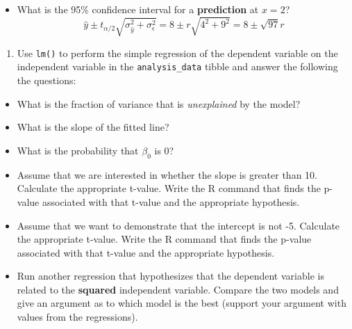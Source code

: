 \documentclass[
]{article}
\newenvironment{Shaded}{\begin{snugshade}}{\end{snugshade}}
\newcommand{\KeywordTok}[1]{\textcolor[rgb]{0.13,0.29,0.53}{\textbf{#1}}}
\newcommand{\NormalTok}[1]{#1}
\newcommand{\OperatorTok}[1]{\textcolor[rgb]{0.81,0.36,0.00}{\textbf{#1}}}
\newcommand{\StringTok}[1]{\textcolor[rgb]{0.31,0.60,0.02}{#1}}
\providecommand{\tightlist}{%
  \setlength{\itemsep}{0pt}\setlength{\parskip}{0pt}}
\begin{document}
\begin{itemize}
\tightlist
\item
  What is the 95\% confidence interval for a \textbf{prediction} at
  \(x = 2\)?
  \[\hat{y}\pm t_{\alpha/2}\sqrt{\sigma_{\hat{y}}^2+\sigma_\epsilon^2}=8\pm r\sqrt{4^2+9^2}=\boxed{8\pm\sqrt{97}r}\]
\end{itemize}

\begin{enumerate}
\def\labelenumi{\arabic{enumi}.}
\setcounter{enumi}{4}
\tightlist
\item
  Use \texttt{lm()} to perform the simple regression of the dependent
  variable on the independent variable in the \texttt{analysis\_data}
  tibble and answer the following the questions:
\end{enumerate}

\begin{Shaded}
\end{Shaded}

\begin{itemize}
\tightlist
\item
  What is the fraction of variance that is \emph{unexplained} by the
  model?
\item
  What is the slope of the fitted line?
\item
  What is the probability that \(\beta_0\) is 0?
\item
  Assume that we are interested in whether the slope is greater than 10.
  Calculate the appropriate t-value. Write the R command that finds the
  p-value associated with that t-value and the appropriate hypothesis.
\item
  Assume that we want to demonstrate that the intercept is not -5.
  Calculate the appropriate t-value. Write the R command that finds the
  p-value associated with that t-value and the appropriate hypothesis.
\item
  Run another regression that hypothesizes that the dependent variable
  is related to the \textbf{squared} independent variable. Compare the
  two models and give an argument as to which model is the best (support
  your argument with values from the regressions).
\end{itemize}
\end{document}
